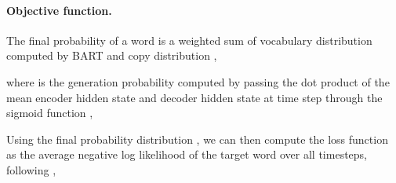 \documentclass[11pt]{article}
\begin{document}
{
\vspace{-4mm}
\small

}
\paragraph{Objective function.}
The final probability  of a word  is a weighted sum of vocabulary distribution computed by \textsc{BART}  and copy distribution ,

{
\vspace{-4mm}
\small

}where  is the generation probability computed by passing the dot product of the mean encoder hidden state and decoder hidden state  at time step  through the sigmoid function ,

{
\vspace{-4mm}
\small

}
Using the final probability distribution , we can then compute the loss function as the average negative log likelihood of the target word  over all timesteps, following \citet{see-etal-2017-get},

{
\vspace{-4mm}
\small

}
\end{document}
